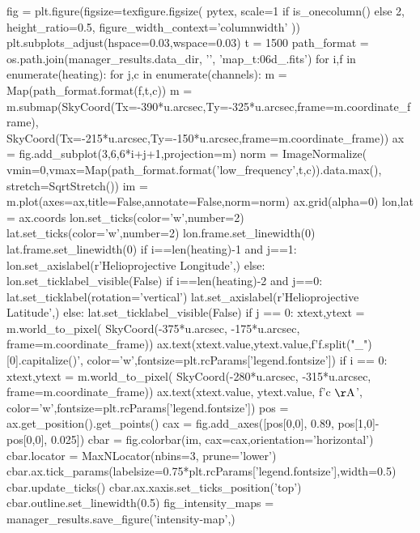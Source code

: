 \begin{pycode}
fig = plt.figure(figsize=texfigure.figsize(
    pytex,
    scale=1 if is_onecolumn() else 2,
    height_ratio=0.5, 
    figure_width_context='columnwidth'
))
plt.subplots_adjust(hspace=0.03,wspace=0.03)
t = 1500
path_format = os.path.join(manager_results.data_dir, '{}', 'map_t{:06d}_{}.fits')
for i,f in enumerate(heating):
    for j,c in enumerate(channels):
        m = Map(path_format.format(f,t,c))
        m = m.submap(SkyCoord(Tx=-390*u.arcsec,Ty=-325*u.arcsec,frame=m.coordinate_frame),
                     SkyCoord(Tx=-215*u.arcsec,Ty=-150*u.arcsec,frame=m.coordinate_frame))
        ax = fig.add_subplot(3,6,6*i+j+1,projection=m)
        norm = ImageNormalize(
            vmin=0,vmax=Map(path_format.format('low_frequency',t,c)).data.max(),
            stretch=SqrtStretch())
        im = m.plot(axes=ax,title=False,annotate=False,norm=norm)
        ax.grid(alpha=0)
        lon,lat = ax.coords
        lon.set_ticks(color='w',number=2)
        lat.set_ticks(color='w',number=2)
        lon.frame.set_linewidth(0)
        lat.frame.set_linewidth(0)
        if i==len(heating)-1 and j==1:
            lon.set_axislabel(r'Helioprojective Longitude',)
        else:
            lon.set_ticklabel_visible(False)
        if i==len(heating)-2 and j==0:
            lat.set_ticklabel(rotation='vertical')
            lat.set_axislabel(r'Helioprojective Latitude',)
        else:
            lat.set_ticklabel_visible(False)
        if j == 0:
            xtext,ytext = m.world_to_pixel(
                SkyCoord(-375*u.arcsec, -175*u.arcsec, frame=m.coordinate_frame))
            ax.text(xtext.value,ytext.value,f'{f.split("_")[0].capitalize()}',
                    color='w',fontsize=plt.rcParams['legend.fontsize'])
        if i == 0:
            xtext,ytext = m.world_to_pixel(
                SkyCoord(-280*u.arcsec, -315*u.arcsec, frame=m.coordinate_frame))
            ax.text(xtext.value, ytext.value, f'{c} $\mathrm{{\AA}}$',
                    color='w',fontsize=plt.rcParams['legend.fontsize'])
            pos = ax.get_position().get_points()
            cax = fig.add_axes([pos[0,0], 0.89, pos[1,0]-pos[0,0], 0.025])
            cbar = fig.colorbar(im, cax=cax,orientation='horizontal')
            cbar.locator = MaxNLocator(nbins=3, prune='lower')
            cbar.ax.tick_params(labelsize=0.75*plt.rcParams['legend.fontsize'],width=0.5)
            cbar.update_ticks()
            cbar.ax.xaxis.set_ticks_position('top')
            cbar.outline.set_linewidth(0.5)
fig_intensity_maps = manager_results.save_figure('intensity-map',)

\end{pycode}
